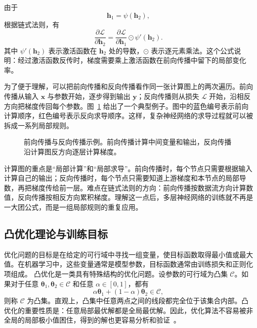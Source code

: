由于
\[
\mathbf{h}_1=\psi(\mathbf{h}_2),
\]
根据链式法则，有
\[
\frac{\partial \mathcal{L}}{\partial \mathbf{h}_2}
=
\frac{\partial \mathcal{L}}{\partial \mathbf{h}_1}
\odot
\psi'(\mathbf{h}_2).
\]
其中 $\psi'(\mathbf{h}_2)$ 表示激活函数在 $\mathbf{h}_2$ 处的导数，$\odot$ 表示逐元素乘法。这个公式说明：经过激活函数反传时，梯度需要乘上激活函数在前向传播中留下的局部变化率。

为了便于理解，可以把前向传播和反向传播看作同一张计算图上的两次遍历。前向传播从输入 $\mathbf{x}$ 与参数开始，逐步得到输出 $\mathbf{y}$；反向传播则从损失 $\mathcal{L}$ 开始，沿相反方向把梯度传回每个参数。图~\ref{fig:aml-forward-backward-example} 给出了一个典型例子。图中的蓝色编号表示前向计算顺序，红色编号表示反向求导顺序。这样，复杂神经网络的求导过程就可以被拆成一系列局部规则。

\begin{figure}[htbp]
  \centering
  
  \caption{前向传播与反向传播示例。前向传播计算中间变量和输出，反向传播沿计算图反方向逐层计算梯度。}
  \label{fig:aml-forward-backward-example}
\end{figure}

\begin{importantnote}
  计算图的重点是“局部计算”和“局部求导”。前向传播时，每个节点只需要根据输入计算自己的输出；反向传播时，每个节点只需要知道上游梯度和本节点的局部导数，再把梯度传给前一层。难点在链式法则的方向：前向传播按数据流方向计算数值，反向传播按相反方向累积梯度。理解这一点后，多层神经网络的训练就不再是一大团公式，而是一组局部规则的重复应用。
\end{importantnote}


\subsection{凸优化理论与训练目标}

优化问题的目标是在给定的可行域中寻找一组变量，使目标函数取得最小值或最大值。在机器学习中，这些变量通常是模型参数，目标函数通常由训练损失和正则化项组成。 凸优化是一类具有特殊结构的优化问题。设参数的可行域为凸集 $\mathcal{C}$。如果对于任意 $\boldsymbol{\theta}_1,\boldsymbol{\theta}_2\in\mathcal{C}$ 和任意 $\alpha\in[0,1]$，都有
\[
\alpha\boldsymbol{\theta}_1
+
(1-\alpha)\boldsymbol{\theta}_2
\in\mathcal{C},
\]
则称 $\mathcal{C}$ 为凸集。直观上，凸集中任意两点之间的线段都完全位于该集合内部。凸优化的重要性质是：任意局部最优解都是全局最优解。因此，优化算法不容易被非全局的局部极小值困住，得到的解也更容易分析和验证~\cite{BoydVandenberghe2004Convex}。


